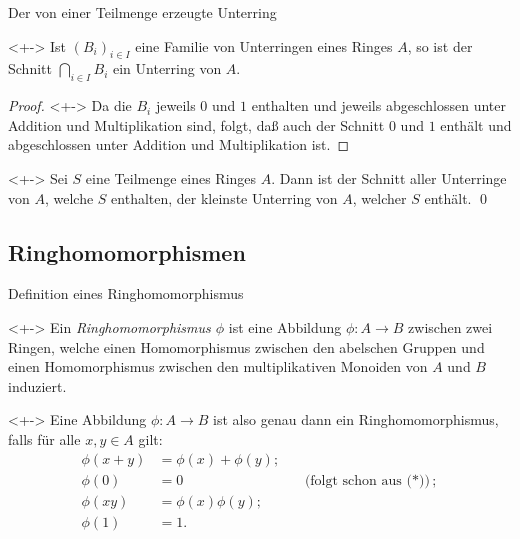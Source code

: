 \begin{frame}{Der von einer Teilmenge erzeugte Unterring}
    \begin{proposition}<+->
        Ist \((B_i)_{i \in I}\) eine Familie von Unterringen eines
        Ringes \(A\),
        so ist der Schnitt \(\bigcap\limits_{i \in I} B_i\) ein Unterring von \(A\).
    \end{proposition}
    \begin{proof}<+->
        Da die \(B_i\) jeweils \(0\) und \(1\) enthalten und jeweils abgeschlossen
        unter Addition und Multiplikation sind, folgt, daß auch der Schnitt \(0\)
        und \(1\) enthält und abgeschlossen unter Addition und Multiplikation ist.
    \end{proof}
    \begin{construction}<+->
        Sei \(S\) eine Teilmenge eines Ringes \(A\). Dann ist der Schnitt
        aller Unterringe von \(A\), welche \(S\) enthalten, der kleinste Unterring
        von \(A\), welcher \(S\) enthält.
        \qed
    \end{construction}        
\end{frame}

\subsection{Ringhomomorphismen}

\begin{frame}{Definition eines Ringhomomorphismus}
    \begin{definition}<+->
        Ein \emph{Ringhomomorphismus \(\phi\)} ist eine Abbildung
        \(\phi\colon A \to B\) zwischen zwei Ringen, welche einen Homomorphismus
        zwischen den abelschen Gruppen und einen Homomorphismus zwischen den
        multiplikativen Monoiden von \(A\) und \(B\) induziert.
    \end{definition}
    \begin{visibleenv}<+->
        Eine Abbildung \(\phi\colon A \to B\) ist also genau dann ein
        Ringhomomorphismus, falls für alle \(x, y \in A\) gilt:
        \begin{align*}
        \phi(x + y) & = \phi(x) + \phi(y); \tag{$*$}
        \\
        \phi(0)     & = 0 && \text{(folgt schon aus ($*$))}; \\
        \phi(x y)   & = \phi(x) \phi(y); \\
        \phi(1)     & = 1.
        \end{align*}
    \end{visibleenv}
\end{frame}

